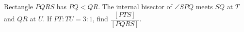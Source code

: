 Rectangle $ PQRS $ has $ PQ<QR $. The internal bisector of $\angle SPQ $ meets $ SQ $ at $ T $ and $ QR $ at $ U $. If $ PT:TU=3:1 $, find $\dfrac{[PTS]}{[PQRS]}$.
